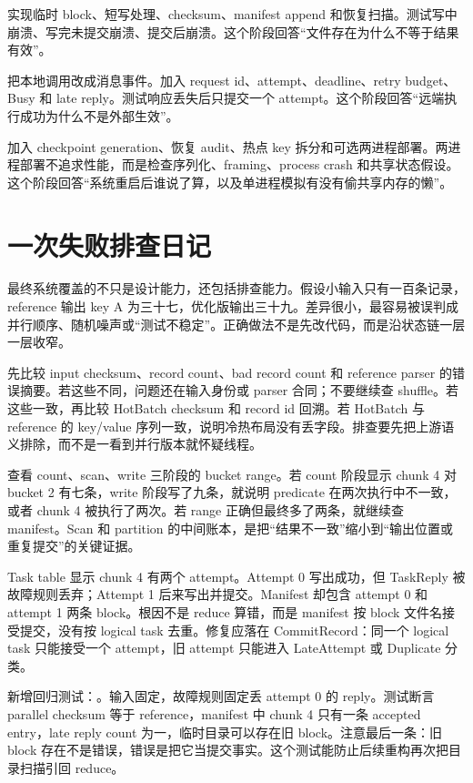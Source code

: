 实现临时 block、短写处理、checksum、manifest append 和恢复扫描。测试写中崩溃、写完未提交崩溃、提交后崩溃。这个阶段回答“文件存在为什么不等于结果有效”。

把本地调用改成消息事件。加入 request id、attempt、deadline、retry budget、Busy 和 late reply。测试响应丢失后只提交一个 attempt。这个阶段回答“远端执行成功为什么不是外部生效”。

加入 checkpoint generation、恢复 audit、热点 key 拆分和可选两进程部署。两进程部署不追求性能，而是检查序列化、framing、process crash 和共享状态假设。这个阶段回答“系统重启后谁说了算，以及单进程模拟有没有偷共享内存的懒”。

\section{一次失败排查日记}

最终系统覆盖的不只是设计能力，还包括排查能力。假设小输入只有一百条记录，reference 输出 key A 为三十七，优化版输出三十九。差异很小，最容易被误判成并行顺序、随机噪声或“测试不稳定”。正确做法不是先改代码，而是沿状态链一层一层收窄。

先比较 input checksum、record count、bad record count 和 reference parser 的错误摘要。若这些不同，问题还在输入身份或 parser 合同；不要继续查 shuffle。若这些一致，再比较 HotBatch checksum 和 record id 回溯。若 HotBatch 与 reference 的 key/value 序列一致，说明冷热布局没有丢字段。排查要先把上游语义排除，而不是一看到并行版本就怀疑线程。

查看 count、scan、write 三阶段的 bucket range。若 count 阶段显示 chunk 4 对 bucket 2 有七条，write 阶段写了九条，就说明 predicate 在两次执行中不一致，或者 chunk 4 被执行了两次。若 range 正确但最终多了两条，就继续查 manifest。Scan 和 partition 的中间账本，是把“结果不一致”缩小到“输出位置或重复提交”的关键证据。

Task table 显示 chunk 4 有两个 attempt。Attempt 0 写出成功，但 TaskReply 被故障规则丢弃；Attempt 1 后来写出并提交。Manifest 却包含 attempt 0 和 attempt 1 两条 block。根因不是 reduce 算错，而是 manifest 按 block 文件名接受提交，没有按 logical task 去重。修复应落在 CommitRecord：同一个 logical task 只能接受一个 attempt，旧 attempt 只能进入 LateAttempt 或 Duplicate 分类。

新增回归测试：。输入固定，故障规则固定丢 attempt 0 的 reply。测试断言 parallel checksum 等于 reference，manifest 中 chunk 4 只有一条 accepted entry，late reply count 为一，临时目录可以存在旧 block。注意最后一条：旧 block 存在不是错误，错误是把它当提交事实。这个测试能防止后续重构再次把目录扫描引回 reduce。

